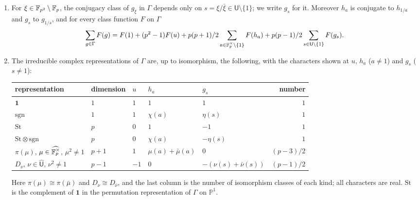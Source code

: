 \begin{lemma}\label{lem:dl:group}
\begin{enumerate}[label=\textup{(\alph*)}]
\item For $\xi\in\mathbb F_{p^2}\setminus\mathbb F_p$, the conjugacy class of $g_\xi$ in
  $\Gamma$ depends only on $s=\xi/\bar\xi\in\mathsf U\setminus\{1\}$; we write
  $g_s$ for it. Moreover $h_a$ is conjugate to $h_{1/a}$ and $g_s$ to
  $g_{1/s}$, and for every class function $F$ on $\Gamma$
  \begin{equation}\label{eq:dl:classsum}
    \sum_{g\in\Gamma}F(g)=F(1)+(p^2-1)F(u)
    +p(p+1)/2\sum_{a\in\mathbb F_p^\times\setminus\{1\}}F(h_a)
    +p(p-1)/2\sum_{s\in\mathsf U\setminus\{1\}}F(g_s).
  \end{equation}
\item The irreducible complex representations of $\Gamma$ are, up to
  isomorphism, the following, with the characters shown at $u$, $h_a$
  ($a\ne1$) and $g_s$ ($s\ne1$):
  \begin{center}\small
  \begin{tabular}{@{}lllllr@{}}
  \toprule
  representation & dimension & $u$ & $h_a$ & $g_s$ & number\\
  \midrule
  $\mathbf 1$ & $1$ & $1$ & $1$ & $1$ & $1$\\
  $\mathrm{sgn}$ & $1$ & $1$ & $\chi(a)$ & $\eta(s)$ & $1$\\
  $\mathrm{St}$ & $p$ & $0$ & $1$ & $-1$ & $1$\\
  $\mathrm{St}\otimes\mathrm{sgn}$ & $p$ & $0$ & $\chi(a)$ & $-\eta(s)$ & $1$\\
  $\pi(\mu)$, $\mu\in\widehat{\mathbb F_p^\times}$, $\mu^2\ne1$ & $p+1$ & $1$
    & $\mu(a)+\bar\mu(a)$ & $0$ & $(p-3)/2$\\
  $D_\nu$, $\nu\in\widehat{\mathsf U}$, $\nu^2\ne1$ & $p-1$ & $-1$ & $0$
    & $-(\nu(s)+\bar\nu(s))$ & $(p-1)/2$\\
  \bottomrule
  \end{tabular}
  \end{center}
  Here $\pi(\mu)\cong\pi(\bar\mu)$ and $D_\nu\cong D_{\bar\nu}$, and the last
  column is the number of isomorphism classes of each kind; all characters are
  real. $\mathrm{St}$ is the complement of $\mathbf 1$ in the permutation
  representation of $\Gamma$ on $\mathbb P^1$.
\end{enumerate}
\end{lemma}

